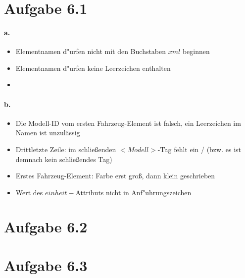 \documentclass{scrartcl}
\begin{document}
	
	

	
	\section*{Aufgabe 6.1}
		\paragraph*{a.}
			\begin{itemize}
				\item Elementnamen d"urfen nicht mit den Buchstaben $ xml $ beginnen
				\item Elementnamen d"urfen keine Leerzeichen enthalten
				\item 
			\end{itemize}
		
		\paragraph*{b.}
			\begin{itemize}
				\item Die Modell-ID vom ersten Fahrzeug-Element ist falsch, ein Leerzeichen im Namen ist unzulässig
				\item Drittletzte Zeile: im schließenden $ <Modell> $-Tag fehlt ein  / (bzw. es ist demnach kein schließendes Tag)
				\item Erstes Fahrzeug-Element: Farbe erst groß, dann klein geschrieben
				\item Wert des $ einheit-$Attributs nicht in Anf"uhrungszeichen 	
			\end{itemize}
	
	\section*{Aufgabe 6.2}
		
		
	\section*{Aufgabe 6.3}
\end{document}
